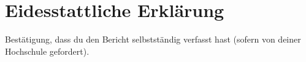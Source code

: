 \chapter{Eidesstattliche Erklärung}
Bestätigung, dass du den Bericht selbstständig verfasst hast (sofern von deiner Hochschule gefordert).